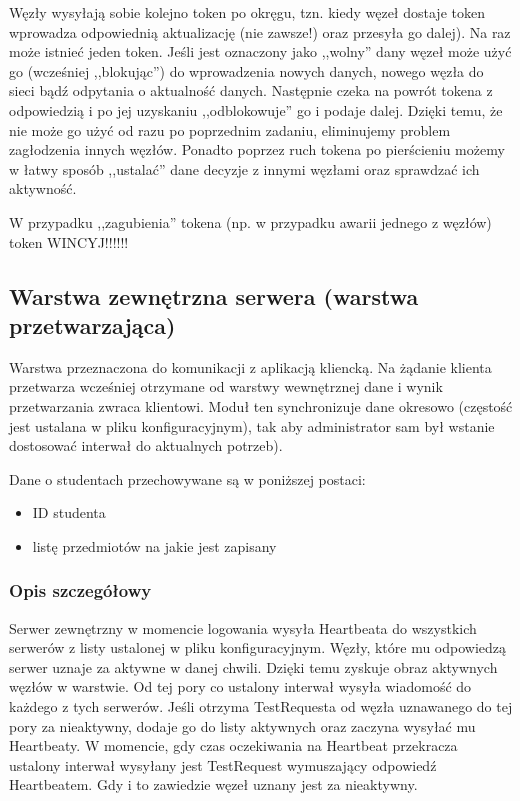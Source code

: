 \par{Węzły wysyłają sobie kolejno token po okręgu, tzn. kiedy węzeł dostaje token wprowadza odpowiednią aktualizację (nie zawsze!) oraz przesyła go dalej). Na raz może istnieć jeden token. Jeśli jest oznaczony jako ,,wolny'' dany węzeł może użyć go (wcześniej ,,blokując'') do wprowadzenia nowych danych, nowego węzła do sieci bądź odpytania o aktualność danych. Następnie czeka na powrót tokena z odpowiedzią i po jej uzyskaniu ,,odblokowuje'' go i podaje dalej. Dzięki temu, że nie może go użyć od razu po poprzednim zadaniu, eliminujemy problem zagłodzenia innych węzłów. Ponadto poprzez ruch tokena po pierścieniu możemy w łatwy sposób ,,ustalać'' dane decyzje z innymi węzłami oraz sprawdzać ich aktywność.}

\par{W przypadku ,,zagubienia'' tokena (np. w przypadku awarii jednego z węzłów) token WINCYJ!!!!!!}


\subsection[Warstwa zewnętrzna serwera]{Warstwa zewnętrzna serwera (warstwa przetwarzająca)}

\par{Warstwa przeznaczona do komunikacji z aplikacją kliencką. Na żądanie klienta przetwarza wcześniej otrzymane od warstwy wewnętrznej dane i wynik przetwarzania zwraca klientowi. Moduł ten synchronizuje dane okresowo (częstość jest ustalana w pliku konfiguracyjnym), tak aby administrator sam był wstanie dostosować interwał do aktualnych potrzeb).}

\par{Dane o studentach przechowywane są w poniższej postaci:}

\begin{itemize}
\item ID studenta
\item listę przedmiotów na jakie jest zapisany
\end{itemize}

\subsubsection*[Opis szczegółowy]{Opis szczegółowy}
\par{Serwer zewnętrzny w momencie logowania wysyła Heartbeata do wszystkich serwerów z listy ustalonej w pliku konfiguracyjnym. Węzły, które mu odpowiedzą serwer uznaje za aktywne w danej chwili. Dzięki temu zyskuje obraz aktywnych węzłów w warstwie. Od tej pory co ustalony interwał wysyła wiadomość do każdego z tych serwerów. Jeśli otrzyma TestRequesta od węzła uznawanego do tej pory za nieaktywny, dodaje go do listy aktywnych oraz zaczyna wysyłać mu Heartbeaty. W momencie, gdy czas oczekiwania na Heartbeat przekracza ustalony interwał wysyłany jest TestRequest wymuszający odpowiedź Heartbeatem. Gdy i to zawiedzie węzeł uznany jest za nieaktywny.}

